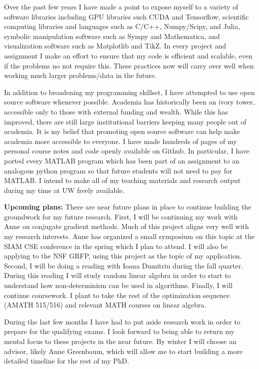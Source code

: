 \documentclass[11pt]{article}
\begin{document}
Over the past few years I have made a point to expose myself to a variety of software libraries including GPU libraries such CUDA and Tensorflow, scientific computing libraries and languages such as C/C++, Numpy/Scipy, and Julia, symbolic manipulation software such as Sympy and Mathematica, and visualization software such as Matplotlib and TikZ. In every project and assignment I make an effort to ensure that my code is efficient and scalable, even if the problems no not require this. These practices now will carry over well when working much larger problems/data in the future.

In addition to broadening my programming skillset, I have attempted to use open source software whenever possible. 
Academia has historically been an ivory tower, accessible only to those with external funding and wealth. While this has improved, there are still large institutional barriers keeping many people out of academia. It is my belief that promoting open source software can help make academia more accessible to everyone.
I have made hundreds of pages of my personal course notes and code openly available on Github. In particular, I have ported every MATLAB program which has been part of an assignment to an analogous python program so that future students will not need to pay for MATLAB. 
I intend to make all of my teaching materials and research output during my time at UW freely available.


\textbf{Upcoming plans:}
There are near future plans in place to continue building the groundwork for my future research. First, I will be continuing my work with Anne on conjugate gradient methods. Much of this project aligns very well with my research interests. Anne has organized a small symposium on this topic at the SIAM CSE conference in the spring which I plan to attend. I will also be applying to the NSF GRFP, using this project as the topic of my application.
Second, I will be doing a reading with Ioana Dumitriu during the fall quarter.
During this reading I will study random linear algebra in order to start to understand how non-determinism can be used in algorithms. 
Finally, I will continue coursework. I plant to take the rest of the optimization sequence (AMATH 515/516) and relevant MATH courses on linear algebra.


During the last few months I have had to put aside research work in order to prepare for the qualifying exams. I look forward to being able to return my mental focus to these projects in the near future. 
By winter I will choose an advisor, likely Anne Greenbaum, which will allow me to start building a more detailed timeline for the rest of my PhD.






\end{document}
